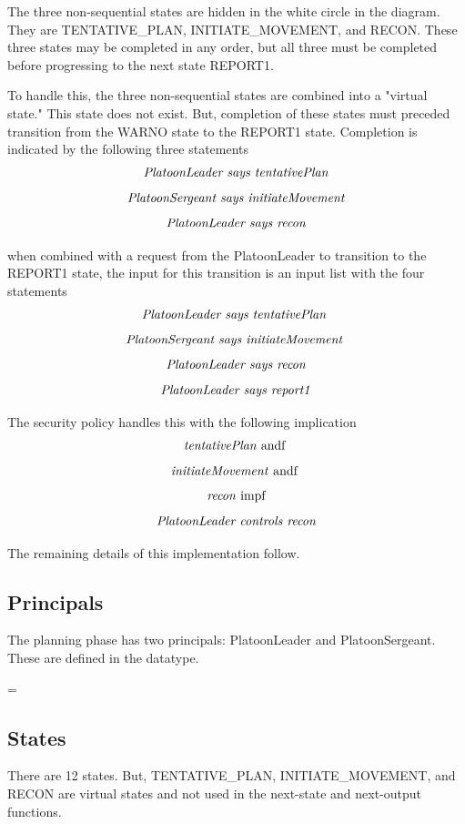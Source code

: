 \documentclass[../../main/main.tex]{subfiles}
\begin{document}
The three non-sequential states are hidden in the white circle in the diagram.  They are TENTATIVE_PLAN, INITIATE_MOVEMENT, and RECON. These three states may be completed in any order, but all three must be completed before progressing to the next state REPORT1.  

To handle this, the three non-sequential states are combined into a "virtual state."  This state does not exist.  But, completion of these states must preceded transition from the WARNO state to the REPORT1 state.  Completion is indicated by the following three  statements
\[\text{\textit{PlatoonLeader says tentativePlan}}\]
\[\text{\textit{PlatoonSergeant says initiateMovement}}\]
\[\text{\textit{PlatoonLeader says recon}}\]


when combined with a request from the PlatoonLeader to transition to the REPORT1 state, the input for this transition is an input list with the four statements
\[\text{\textit{PlatoonLeader says tentativePlan}  }\]
\[\text{\textit{PlatoonSergeant says initiateMovement}  }\]
\[\text{\textit{PlatoonLeader says recon}}\]
\[\text{\textit{PlatoonLeader says report1}}\]

The security policy handles this with the following implication
\[\text{\textit{tentativePlan} andf  }\]
\[\text{\textit{initiateMovement} andf  }\]
\[\text{\textit{recon} impf}\]
\[\text{\textit{PlatoonLeader controls recon}}\]

The remaining details of this implementation follow.
\subsection{Principals}
The planning phase  has two principals: PlatoonLeader and PlatoonSergeant.  These are defined in the  datatype.

 =  \HOLTokenBar{} 

\subsection{States}
There are 12 states.  But, TENTATIVE_PLAN, INITIATE_MOVEMENT, and RECON are virtual states and not used in the next-state and next-output functions.
\end{document}
